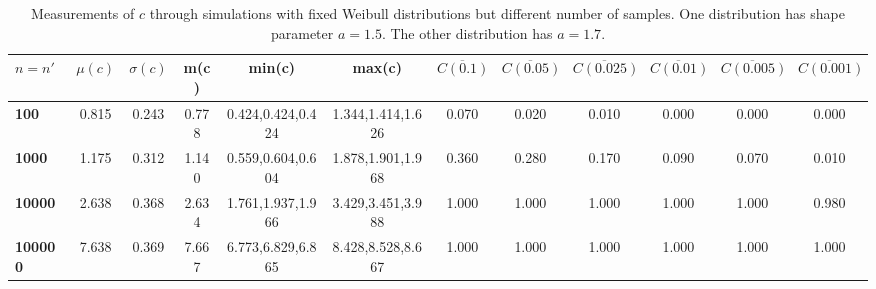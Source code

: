 \begin{table*}[h!]
\begin{center}
\begin{tabular}{| l | c | c | c | c | c | c | c | c | c | c | c |}\hline
$n=n'$ & $\mu(c)$ & $\sigma(c)$ & m(c) & min(c) & max(c) & $\overline{C(0.1)}$ & $\overline{C(0.05)}$ & $\overline{C(0.025)}$ & $\overline{C(0.01)}$ & $\overline{C(0.005)}$ & $\overline{C(0.001)}$ \\\hline\hline
{\bf 100} & 0.815 & 0.243 & 0.778 & 0.424,0.424,0.424 & 1.344,1.414,1.626 & 0.070 & 0.020 & 0.010 & 0.000 & 0.000 & 0.000 \\\hline
{\bf 1000} & 1.175 & 0.312 & 1.140 & 0.559,0.604,0.604 & 1.878,1.901,1.968 & 0.360 & 0.280 & 0.170 & 0.090 & 0.070 & 0.010 \\\hline
{\bf 10000} & 2.638 & 0.368 & 2.634 & 1.761,1.937,1.966 & 3.429,3.451,3.988 & 1.000 & 1.000 & 1.000 & 1.000 & 1.000 & 0.980 \\\hline
{\bf 100000} & 7.638 & 0.369 & 7.667 & 6.773,6.829,6.865 & 8.428,8.528,8.667 & 1.000 & 1.000 & 1.000 & 1.000 & 1.000 & 1.000 \\\hline
\end{tabular}
\caption{Measurements of $c$ through simulations
        with fixed Weibull distributions but different number of samples.
        One distribution has shape parameter $a=1.5$.
        The other distribution has $a=1.7$.}
\end{center}
\end{table*}